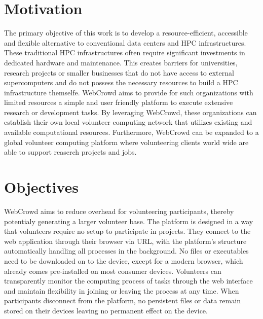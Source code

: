 \section{Motivation}
\label{sec:intro:motivation}
The primary objective of this work is to develop a resource-efficient, accessible and flexible alternative to conventional data centers and \ac{HPC} infrastructures. These traditional \ac{HPC} infrastructures often require significant investments in dedicated hardware and maintenance. This creates barriers for universities, research projects or smaller businesses that do not have access to external supercomputers and do not possess the necessary resources to build a \ac{HPC} infrastructure themselfe. WebCrowd aims to provide for such organizations with limited resources a simple and user friendly platform to execute extensive research or development tasks. By leveraging WebCrowd, these organizations can establish their own local volunteer computing network that utilizes existing and available computational resources. Furthermore, WebCrowd can be expanded to a global volunteer computing platform where volunteering clients world wide are able to support reaserch projects and jobs.

\section{Objectives}
\label{sec:intro:objectives}
WebCrowd aims to reduce overhead for volunteering participants, thereby potentialy generating a larger volunteer base. The platform is designed in a way that volunteers require no setup to participate in projects. They connect to the web application through their browser via \acs{URL}, with the platform's structure automatically handling all processes in the background. No files or executables need to be downloaded on to the device, except for a modern browser, which already comes pre-installed on most consumer devices. Volunteers can transparently monitor the computing process of tasks through the web interface and maintain flexibility in joining or leaving the process at any time. When participants disconnect from the platform, no persistent files or data remain stored on their devices leaving no permanent effect on the device. 


